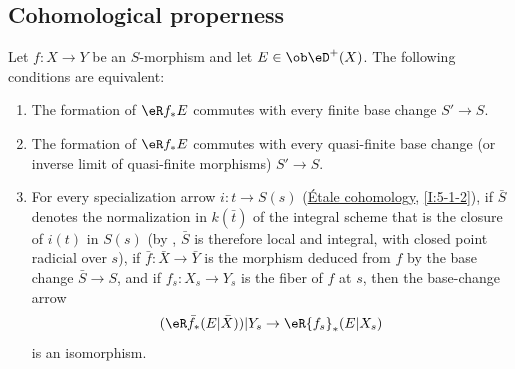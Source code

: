 \subsection{Cohomological properness}\label{VII:5-1}






\begin{proposition}\label{VII:5-1-1}
Let $f:X\to Y$ be an $S$-morphism and let $E\in\ob \eD^+(X)$. The following
conditions are equivalent:
\begin{enumerate}[\indent (i)]
  \item The formation of $\eR f_\ast E$ commutes with every finite base change
    $S'\to S$.
  \item The formation of $\eR f_\ast E$ commutes with every quasi-finite base
    change (or inverse limit of quasi-finite morphisms) $S'\to S$.
  \item For every specialization arrow $i:t\to S(s)$
    (\hyperref[I]{Étale cohomology}, \ref{I:5-1-2}), if $\bar S$ denotes
    the normalization in $k(\bar t)$ of the integral scheme that is the
    closure of $i(t)$ in $S(s)$ (by
    , $\bar S$ is therefore local and
    integral, with closed point radicial over $s$), if
    $\bar f:\bar X\to \bar Y$ is the morphism deduced from $f$ by the base
    change $\bar S\to S$, and if $f_s:X_s\to Y_s$ is the fiber of $f$ at $s$,
    then the base-change arrow
    \[
      (\eR \bar f_\ast (E|\bar X))|Y_s \to \eR {f_s}_\ast(E|X_s) 
    \]
    is an isomorphism.
\end{enumerate}
\end{proposition}

